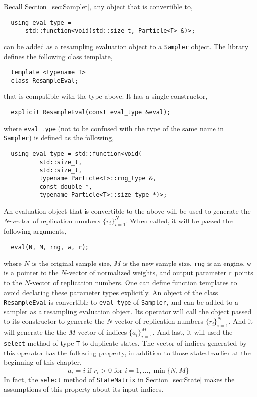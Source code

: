 Recall Section~\ref{sec:Sampler}, any object that is convertible to,
\begin{Verbatim}
  using eval_type =
      std::function<void(std::size_t, Particle<T> &)>;
\end{Verbatim}
can be added as a resampling evaluation object to a \verb|Sampler| object. The
library defines the following class template,
\begin{Verbatim}
  template <typename T>
  class ResampleEval;
\end{Verbatim}
that is compatible with the type above. It has a single constructor,
\begin{Verbatim}
  explicit ResampleEval(const eval_type &eval);
\end{Verbatim}
where \verb|eval_type| (not to be confused with the type of the same name in
\verb|Sampler|) is defined as the following,
\begin{Verbatim}
  using eval_type = std::function<void(
          std::size_t,
          std::size_t,
          typename Particle<T>::rng_type &,
          const double *,
          typename Particle<T>::size_type *)>;
\end{Verbatim}
An evaluation object that is convertible to the above will be used to generate
the $N$-vector of replication numbers $\{r_i\}_{i=1}^N$. When called, it will
be passed the following arguments,
\begin{Verbatim}
  eval(N, M, rng, w, r);
\end{Verbatim}
where $N$ is the original sample size, $M$ is the new sample size, \verb|rng|
is an \rng engine, \verb|w| is a pointer to the $N$-vector of normalized
weights, and output parameter \verb|r| points to the $N$-vector of replication
numbers. One can define function templates to avoid declaring these parameter
types explicitly. An object of the class \verb|ResampleEval| is convertible to
\verb|eval_type| of \verb|Sampler|, and can be added to a sampler as a
resampling evaluation object. Its operator will call the object passed to its
constructor to generate the $N$-vector of replication numbers
$\{r_i\}_{i=1}^N$. And it will generate the the $M$-vector of indices
$\{a_i\}_{i=1}^M$. And last, it will used the \verb|select| method of type
\verb|T| to duplicate states. The vector of indices generated by this operator
has the following property, in addition to those stated earlier at the
beginning of this chapter,
\begin{equation*}
  a_i = i \text{ if } r_i > 0 \text{ for } i = 1,\dots,\min\{N, M\}
\end{equation*}
In fact, the \verb|select| method of \verb|StateMatrix| in
Section~\ref{sec:State} makes the assumptions of this property about its input
indices.

